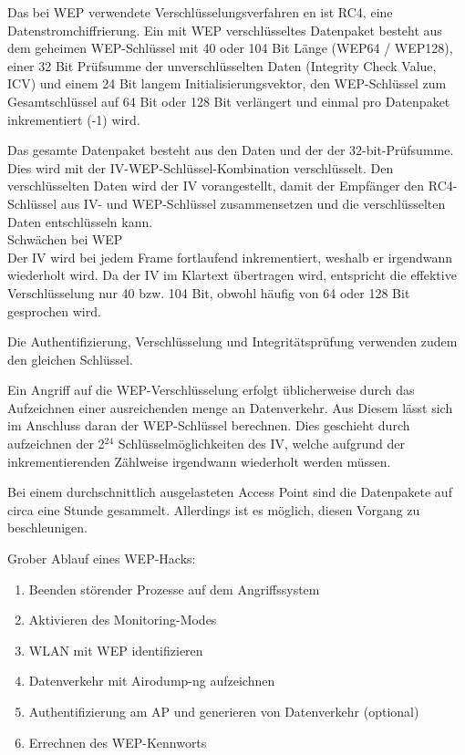 Das bei WEP verwendete Verschlüsselungsverfahren en ist RC4, eine Datenstromchiffrierung.  Ein mit WEP verschlüsseltes Datenpaket besteht aus dem geheimen WEP-Schlüssel mit 40 oder 104 Bit Länge (WEP64 / WEP128), einer 32 Bit Prüfsumme der unverschlüsselten Daten (Integrity Check Value, ICV) und einem 24 Bit langem Initialisierungsvektor,  den WEP-Schlüssel zum Gesamtschlüssel auf 64 Bit oder 128 Bit verlängert und einmal pro Datenpaket inkrementiert (-1) wird. 

Das gesamte Datenpaket besteht aus den Daten und der der 32-bit-Prüfsumme. Dies wird mit der IV-WEP-Schlüssel-Kombination verschlüsselt. Den verschlüsselten Daten wird der IV vorangestellt, damit der Empfänger den RC4-Schlüssel aus IV- und WEP-Schlüssel zusammensetzen und die verschlüsselten Daten entschlüsseln kann.\\

{\Large Schwächen bei WEP}\\
Der IV wird bei jedem Frame fortlaufend inkrementiert, weshalb er irgendwann wiederholt wird. 
Da der IV im Klartext übertragen wird, entspricht die effektive Verschlüsselung nur 40 bzw. 104 Bit, obwohl häufig von 64 oder 128 Bit gesprochen wird.

Die Authentifizierung, Verschlüsselung und Integritätsprüfung verwenden zudem den gleichen Schlüssel. 

Ein Angriff auf die WEP-Verschlüsselung erfolgt üblicherweise durch das Aufzeichnen einer ausreichenden menge an Datenverkehr. Aus Diesem lässt sich im Anschluss daran der WEP-Schlüssel berechnen. Dies geschieht durch aufzeichnen der 2$^{24}$ Schlüsselmöglichkeiten des IV, welche aufgrund der inkrementierenden Zählweise irgendwann wiederholt werden müssen. 

Bei einem durchschnittlich ausgelasteten Access Point sind die Datenpakete auf circa eine Stunde gesammelt. Allerdings ist es möglich, diesen Vorgang zu beschleunigen. 

Grober Ablauf eines WEP-Hacks:

\begin{enumerate}
\item Beenden störender Prozesse auf dem Angriffssystem
\item Aktivieren des Monitoring-Modes
\item WLAN mit WEP identifizieren
\item Datenverkehr mit Airodump-ng aufzeichnen
\item Authentifizierung am AP und generieren von Datenverkehr (optional)
\item Errechnen des WEP-Kennworts
\end{enumerate}

